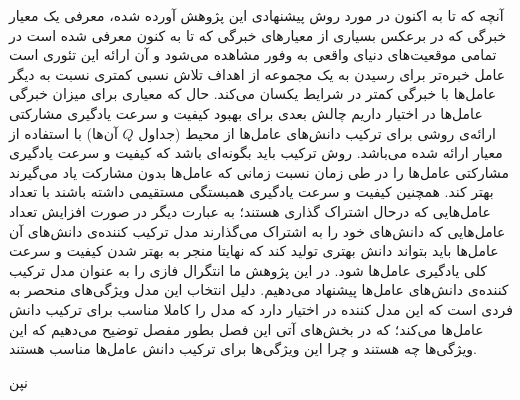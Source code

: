 آنچه که تا به اکنون در مورد روش پیشنهادی این پژوهش آورده شده، معرفی یک معیار خبرگی که در برعکس بسیاری از معیارهای خبرگی که تا به کنون معرفی شده است در تمامی موقعیت‌های دنیای واقعی به وفور مشاهده می‌شود و آن ارائه این تئوری است عامل خبره‌تر برای رسیدن به یک مجموعه از اهداف تلاش نسبی کمتری نسبت به دیگر عامل‌ها با خبرگی کمتر در شرایط یکسان می‌کند. حال که معیاری برای میزان خبرگی عامل‌ها در اختیار داریم چالش بعدی برای بهبود کیفیت و سرعت یادگیری مشارکتی ارائه‌ی روشی برای ترکیب دانش‌های عامل‌ها از محیط (جداول $Q$ آن‌ها) با استفاده از معیار ارائه شده می‌باشد. روش ترکیب باید بگونه‌ای باشد که کیفیت و سرعت یادگیری مشارکتی عامل‌ها را در طی زمان نسبت زمانی که عامل‌ها بدون مشارکت یاد می‌گیرند بهتر کند. همچنین کیفیت و سرعت یادگیری همبستگی مستقیمی داشته باشند با تعداد عامل‌هایی که درحال اشتراک گذاری هستند؛ به عبارت دیگر در صورت افزایش تعداد عامل‌هایی که دانش‌های خود را به اشتراک می‌گذارند مدل ترکیب کننده‌ی دانش‌های آن‌ عامل‌ها باید بتواند دانش‌ بهتری تولید کند که نهایتا منجر به بهتر شدن کیفیت و سرعت کلی یادگیری عامل‌ها شود.
در این پژوهش ما انتگرال فازی را به عنوان مدل ترکیب کننده‌ی دانش‌های عامل‌ها پیشنهاد می‌دهیم. دلیل انتخاب این مدل ویژگی‌های منحصر به فردی است که این مدل کننده در اختیار دارد که مدل را کاملا مناسب برای ترکیب دانش‌ عامل‌ها می‌کند؛ که در بخش‌های آتی این فصل بطور مفصل توضیح می‌دهیم که این ویژگی‌ها چه هستند و چرا این ویژگی‌ها برای ترکیب دانش عامل‌ها مناسب هستند.

نپن

